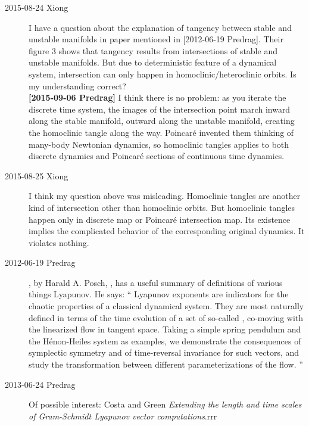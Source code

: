 \begin{description}
  \item[2015-08-24 Xiong] I have a question about the explanation of
      tangency between stable and unstable manifolds in paper mentioned
      in [2012-06-19 Predrag].
    Their figure 3 shows that tangency results from
    intersections of stable and unstable manifolds. But
    due to deterministic feature of a dynamical system,
    intersection can only happen in homoclinic/heteroclinic orbits.
    Is my understanding correct?
        \\ {\bf [2015-09-06 Predrag]} I think there is no problem: as you
        iterate the discrete time system, the images of the intersection
        point march inward along the stable manifold, outward along the
        unstable manifold, creating the homoclinic tangle along the way.
        Poincar\'e invented them thinking of many-body Newtonian
        dynamics, so homoclinic tangles applies to both discrete dynamics
        and Poincar\'e sections of continuous time dynamics.

  \item[2015-08-25 Xiong] I think my question above was misleading.
    Homoclinic tangles are another kind of intersection other than
    homoclinic orbits. But homoclinic tangles happen only in discrete
    map or Poincar\'e intersection map. Its existence implies the
    complicated behavior of the corresponding original dynamics.
    It violates nothing.

\item[2012-06-19 Predrag]                               , by Harald A. Posch, , has a
    useful summary of definitions of various things Lyapunov. He says:
    `` Lyapunov exponents are indicators for the chaotic properties of
    a classical dynamical system. They are most naturally defined in
    terms of the time evolution of a set of so-called {\cLvs},
    co-moving with the linearized flow in tangent space. Taking a
    simple spring pendulum and the H\'enon-Heiles system as examples,
    we demonstrate the consequences of symplectic symmetry and of
    time-reversal invariance for such vectors, and study the
    transformation between different parameterizations of the flow. ''

\item[2013-06-24 Predrag] Of possible interest:
Costa and Green {\em Extending the length and time scales
of {Gram-Schmidt Lyapunov} vector computations}.rrr



\end{description}
